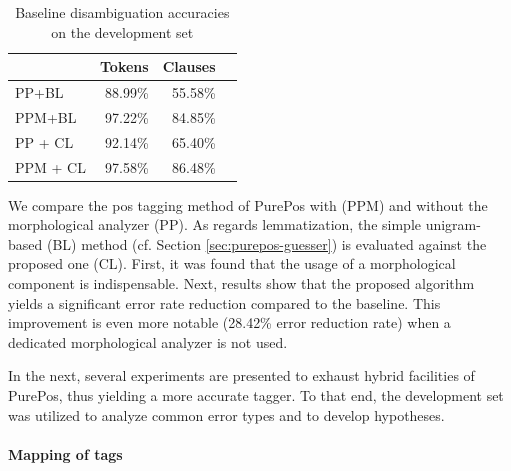 \begin{table}[H]
\centering
\caption{Baseline disambiguation accuracies on the development set}\label{tab:oldhun-baselines}
\begin{tabular}{l r r r}
\hline
 & Tokens & Clauses \\
\hline
PP+BL  & 88.99\% & 55.58\% \\
PPM+BL  & 97.22\% & 84.85\% \\
PP + CL & 92.14\% & 65.40\% \\
PPM + CL & 97.58\% & 86.48\% \\
\hline
\end{tabular}
\end{table}




We compare the \gls{pos} tagging method of PurePos with (PPM) and without the morphological analyzer (PP).
As regards lemmatization, the simple unigram-based (BL) method (cf. Section \ref{sec:purepos-guesser}) is evaluated against the proposed one (CL). 
First, it was found that the usage of a morphological component is indispensable. 
Next, results show that the proposed algorithm yields a significant error rate reduction compared to the baseline. 
This improvement is even more notable  (28.42\% error reduction rate) when a dedicated morphological analyzer is not used.

In the next, several experiments are presented to exhaust hybrid facilities of PurePos, thus yielding a more accurate tagger. 
To that end, the development set was utilized to analyze common error types and to develop hypotheses.

\paragraph{Mapping of tags}

